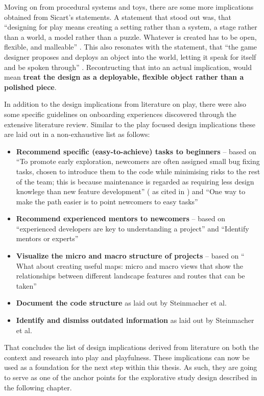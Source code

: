 Moving on from procedural systems and toys, there are some more implications obtained from Sicart's statements. A statement that stood out was, that \enquote{designing for play means creating a setting rather than a system, a stage rather than a world, a model rather than a puzzle. Whatever is created has to be open, flexible, and malleable} \cite[p. 90]{sicart2014play}. This also resonates with the statement, that \enquote{the game designer proposes and deploys an object into the world, letting it speak for itself and be spoken through} \cite[p. 90]{sicart2014play}. Recontructing that into an actual implication, would mean \textbf{treat the design as a deployable, flexible object rather than a polished piece}.

In addition to the design implications from literature on play, there were also some specific guidelines on onboarding experiences discovered through the extensive literature review. Similar to the play focused design implications these are laid out in a non-exhaustive list as follows:

\begin{itemize}
  \item{\textbf{Recommend specific (easy-to-achieve) tasks to beginners} -- based on \enquote{To promote early exploration, newcomers are often assigned small bug fixing tasks, chosen to introduce them to the code while minimising risks to the rest of the team; this is because maintenance is regarded as requiring less design knowlege than new feature development} (\cite{latoza2006maintaining} as cited in \cite[p. 36]{yates2014onboarding}) and \enquote{One way to make the path easier is to point newcomers to easy tasks} \cite[p. 8]{steinmacher2018let}}
  \item{\textbf{Recommend experienced mentors to newcomers} -- based on \enquote{experienced developers are key to understanding a project} \cite[p. 284]{dagenais2010moving} and \enquote{Identify mentors or experts} \cite[p. 9]{steinmacher2018let}}
  \item{\textbf{Visualize the micro and macro structure of projects} -- based on \enquote{ What about creating useful maps: micro and macro views that show the relationships between different landscape features and routes that can be taken} \cite[p. 284]{dagenais2010moving}}
  \item{\textbf{Document the code structure} as laid out by Steinmacher et al. \cite[p. 10]{steinmacher2018let}}
  \item{\textbf{Identify and dismiss outdated information} as laid out by Steinmacher et al. \cite[p. 10]{steinmacher2018let}}
\end{itemize}

That concludes the list of design implications derived from literature on both the context and research into play and playfulness. These implications can now be used as a foundation for the next step within this thesis. As such, they are going to serve as one of the anchor points for the explorative study design described in the following chapter.
